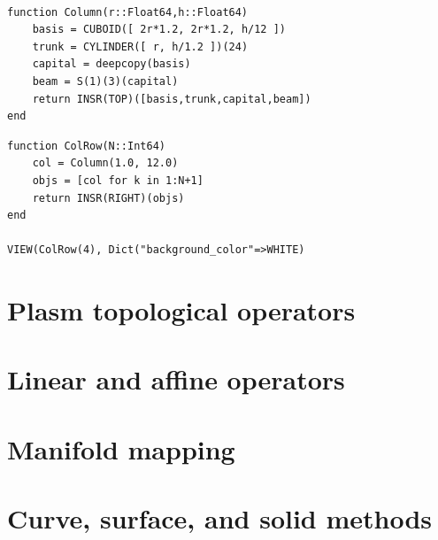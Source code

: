 \begin{coding}\
\begin{lstlisting}[language=JuliaLocal, style=julia, mathescape=true]
function Column(r::Float64,h::Float64)
	basis = CUBOID([ 2r*1.2, 2r*1.2, h/12 ]) 
	trunk = CYLINDER([ r, h/1.2 ])(24)
	capital = deepcopy(basis)
	beam = S(1)(3)(capital) 
	return INSR(TOP)([basis,trunk,capital,beam])
end
\end{lstlisting}

\begin{lstlisting}[language=JuliaLocal, style=julia, mathescape=true]
function ColRow(N::Int64)
	col = Column(1.0, 12.0)
	objs = [col for k in 1:N+1]
	return INSR(RIGHT)(objs)
end

VIEW(ColRow(4), Dict("background_color"=>WHITE)
\end{lstlisting}
\end{coding}


\section{ Plasm topological operators}\label{sect:5-2}


\section{ Linear and affine operators}\label{sect:5-3}


\section{ Manifold mapping}\label{sect:5-4}


\section{ Curve, surface, and solid methods}\label{sect:5-5}


